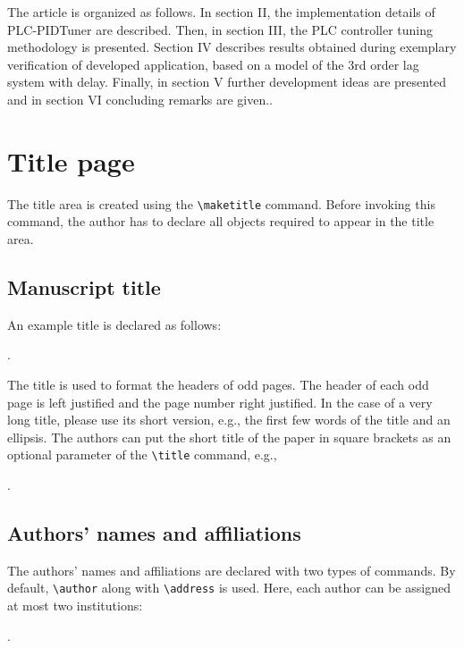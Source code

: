 \documentclass{amcs}
\begin{document}
The article is organized as follows. In section II, the implementation details of PLC-PIDTuner are described. Then, in section III, the PLC controller tuning methodology is presented. Section IV describes results obtained during exemplary verification of developed application, based on a model of the 3rd order lag system with delay. Finally, in section V further development ideas are presented and in section VI concluding remarks are given..

\section{Title page}
The title area is created using the \verb+\maketitle+ command. Before invoking this command, the author has to declare all objects required to appear in the title area.

\subsection{Manuscript title}
\label{title}
An example title is declared as follows:

\medskip
{}.

\medskip\noindent
The title is used to format the headers of odd pages. The header of each odd page is left justified and the page number right justified. In the case of a very long title, please use its short version, e.g., the first few words of the title and an ellipsis. The authors can put the short title of the paper in square brackets as an optional parameter of the \verb+\title+ command, e.g.,

\medskip
{}.

\subsection{Authors' names and affiliations}
The authors' names and affiliations are declared with two types of commands. By default, \verb+\author+ along with \verb+\address+ is used. Here, each author can be assigned at most two institutions:

\medskip
{}.
\end{document}
